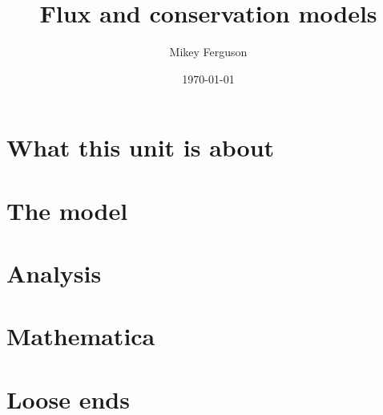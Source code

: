 \documentclass[11pt]{article}
\title{Flux and conservation models}
\author{Mikey Ferguson}
\date{\today}
\begin{document}
\maketitle
\tableofcontents
\bigskip

\section{What this unit is about}

\section{The model}

\section{Analysis}

\section{Mathematica}

\section{Loose ends}
\end{document}
